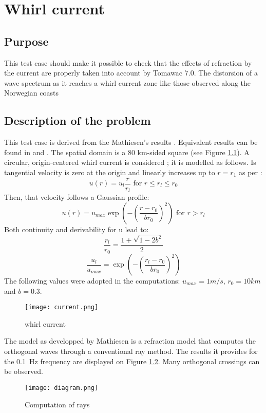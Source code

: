 \chapter{Whirl current}
%

%
\section{Purpose}
%
This test case should make it possible to check that the effects of refraction
by the current are properly taken into account by Tomawac 7.0. The distorsion
of a wave spectrum as it reaches a whirl current zone like those observed along
the Norwegian coasts \cite{Mathiesen1987}
%
\section{Description of the problem}
%
This test case is derived from the Mathiesen's results \cite{Mathiesen1987}.
Equivalent results can be found in \cite{Tolman1991} and \cite{Hubbert1991}. The
spatial domain is a 80 km-sided square (see Figure \ref{current}). A circular,
origin-centered whirl current is considered ; it is modelled as follows. Is
tangential velocity is zero at the origin and linearly increases up to $r=r_1$
as per :
$$
u(r) = u_l\frac{r}{r_l} \mbox{ for } r\le r_l\le r_0
$$
Then, that velocity follows a Gaussian profile:
$$
u(r)=u_{max} \exp \left( -\left(\frac{r-r_0}{br_0}\right)^2 \right) \mbox{ for } r > r_l
$$
Both continuity and derivability for u lead to:
$$
\frac{r_l}{r_0}=\frac{1+ \sqrt{1-2b^2}}{2} %
$$
$$
\frac{u_l}{u_{max}}= \exp \left( -\left(\frac{r_l-r_0}{br_0}\right)^2 \right)
$$
The following values were adopted in the computations: $u_{max}=1m/s$,
$r_0=10km$ and $b=0.3$.
%
%
\begin{figure} [H]
\centering
\texttt{[image: current.png]}
 \caption{whirl current}
\label{current}
\end{figure}
The model as developped by Mathiesen is a refraction model that computes the
orthogonal waves through a conventional ray method. The results it provides for
the 0.1\ Hz frequency are displayed on Figure \ref{ray}. Many orthogonal
crossings can be observed.
\begin{figure} [!h]
\centering
\texttt{[image: diagram.png]}
 \caption{Computation of rays}
\label{ray}
\end{figure}

